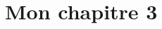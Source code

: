 
\graphicspath{{Figure3/}}

\clearpage{\pagestyle{empty}\cleardoublepage}
\chapter{Mon chapitre 3}

